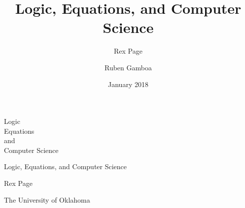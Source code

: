 \documentclass[letterpaper,10pt,extrafontsizesmtwoside,onecolumn,openright,fleqn]{memoir}
\title{Logic, Equations, and Computer Science}
\author{Rex Page \and Ruben Gamboa}
\date{January 2018}
\begin{document}
\frontmatter


\pagestyle{empty}


\vspace*{\fill}
\begin{adjustwidth}{1in}{2cm}
\begin{flushleft}
\HUGE\sffamily Logic\\
\hspace{1cm}\HUGE\sffamily Equations\\
\hspace{3cm}\Huge\sffamily and\\
\hspace{2.6cm}\HUGE\sffamily Computer Science\\
\end{flushleft}
\end{adjustwidth}
\vspace*{\fill}
\cleardoublepage

\vspace*{\fill}
\begin{center}
\Huge\textsf{Logic, Equations, and Computer Science}\par
\end{center}

\vspace{1cm}

\begin{center}
\LARGE\textsf{Rex Page}\par
\Large\textsf{The University of Oklahoma}\par
\end{center}
\end{document}
